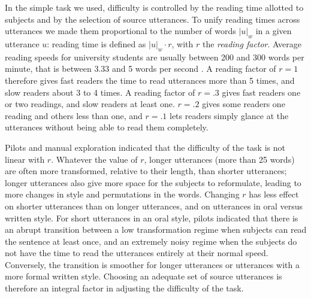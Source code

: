 \documentclass[a4paper,fleqn]{cas-dc}
\begin{document}
In the simple task we used, difficulty is controlled by the reading time
allotted to subjects and by the selection of source utterances. To unify reading times
 across utterances we made them proportional to the number of words \(|u|_w\) in a given utterance \(u\):
reading time is defined as \(|u|_w \cdot r\), with \(r\) the
\emph{reading factor}. Average reading speeds for university students
are usually between 200 and 300 words per minute, that is between 3.33
and 5 words per second \citep%
{rayner_eye_2010}. A reading factor of \(r = 1\) therefore gives fast readers the time to read
utterances more than 5 times, and slow readers about 3 to 4 times. A
reading factor of \(r = .3\) gives fast readers one or two readings, and
slow readers at least one. \(r = .2\) gives some readers one reading and
others less than one, and \(r = .1\) lets readers simply glance at the
utterances without being able to read them completely.

Pilots and manual exploration indicated that the difficulty of the task
is not linear with \(r\). Whatever the value of \(r\), longer utterances
(more than 25 words) are often more transformed, relative to their
length, than shorter utterances; longer utterances also give more space
for the subjects to reformulate, leading to more changes in style and
permutations in the words. Changing \(r\) has less effect on shorter
utterances than on longer utterances, and on utterances in oral versus
written style. For short utterances in an oral style, pilots indicated
that there is an abrupt transition between a low transformation regime
when subjects can read the sentence at least once, and an extremely
noisy regime when the subjects do not have the time to read the
utterances entirely at their normal speed. Conversely, the transition is
smoother for longer utterances or utterances with a more formal written
style. Choosing an adequate set of source utterances is therefore an
integral factor in adjusting the difficulty of the task.
\end{document}
